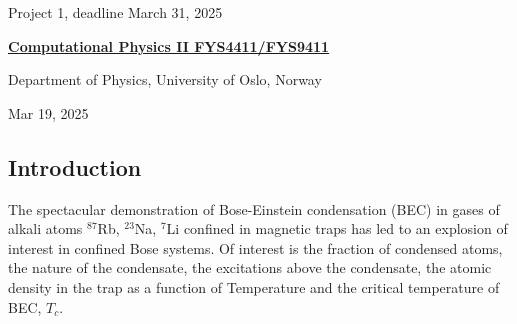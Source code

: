 \documentclass[%
oneside,                 %
final,                   %
10pt]{article}
\begin{document}

\newcommand{\exercisesection}[1]{\subsection*{#1}}






\thispagestyle{empty}

\begin{center}
{\LARGE\bf
\begin{spacing}{1.25}
Project 1, deadline  March 31, 2025
\end{spacing}
}
\end{center}


\begin{center}
{\bf \href{{http://www.uio.no/studier/emner/matnat/fys/FYS4411/index-eng.html}}{Computational Physics II FYS4411/FYS9411}}
\end{center}

    \begin{center}
\centerline{{\small Department of Physics, University of Oslo, Norway}}
\end{center}
    

\begin{center}
Mar 19, 2025
\end{center}

\vspace{1cm}


\subsection{Introduction}

The spectacular demonstration of Bose-Einstein condensation (BEC) in
gases of alkali atoms $^{87}$Rb, $^{23}$Na, $^7$Li confined in
magnetic traps has led to an explosion of interest in confined Bose
systems. Of interest is the fraction of condensed atoms, the nature of
the condensate, the excitations above the condensate, the atomic
density in the trap as a function of Temperature and the critical
temperature of BEC, $T_c$.
\end{document}
